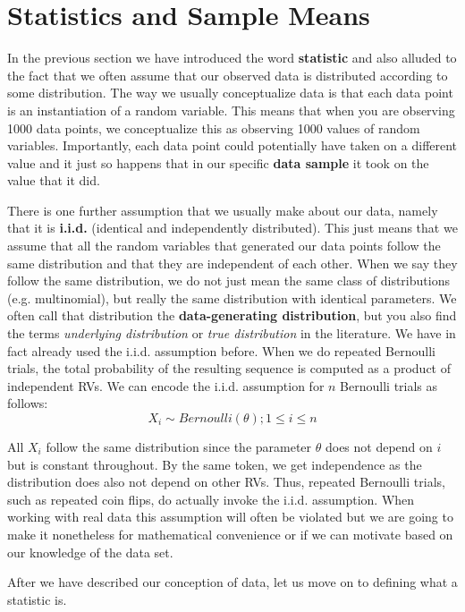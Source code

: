 \section{Statistics and Sample Means}

In the previous section we have introduced the word \textbf{statistic} and also alluded to the fact that we often assume that our
observed data is distributed according to some distribution. The way we usually conceptualize data is that each data point is
an instantiation of a random variable. This means that when you are observing 1000 data points, we conceptualize this as observing
1000 values of random variables. Importantly, each data point could potentially have taken on a different value and it just 
so happens that in our specific \textbf{data sample} it took on the value that it did. 

There is one further assumption that we usually make about our data, namely that it is \textbf{i.i.d.} (identical and independently
distributed). This just means that we assume that all the random variables that generated our data points follow the same distribution and 
that they are independent of each other. When we say they follow the same distribution, we do not just mean the same class of
distributions (e.g. multinomial), but really the same distribution with identical parameters. We often
call that distribution the \textbf{data-generating distribution}, but you also find the terms 
\textit{underlying distribution} or \textit{true distribution} in the literature. 
We have in fact already used the i.i.d.
assumption before. When we do repeated Bernoulli trials, the total probability of the resulting sequence is computed as a product
of independent RVs. We can encode the i.i.d. assumption for $ n $ Bernoulli trials as follows:
\begin{equation}
X_{i} \sim Bernoulli(\theta); 1 \leq i \leq n
\end{equation}

All $ X_{i} $ follow the same distribution since the parameter $ \theta $ does not depend on $ i $ but is constant throughout.
By the same token, we get independence as the distribution does also not depend on other RVs. Thus, repeated Bernoulli trials,
such as repeated coin flips, do actually invoke the i.i.d. assumption. When working with real data this assumption will often be
violated but we are going to make it nonetheless for mathematical convenience or if we can motivate
based on our knowledge of the data set.

After we have described our conception of data, let us move on to defining what a statistic is.

